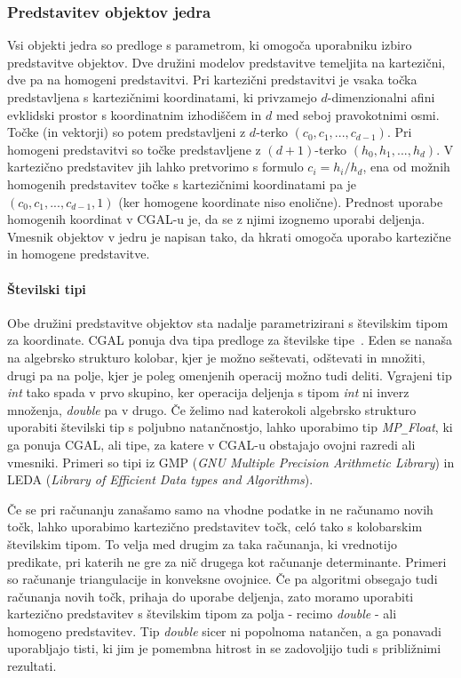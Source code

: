 \documentclass[a4paper, 12pt]{book}
\newcommand{\U}{\texttt{\_}}
\begin{document}
\subsubsection{Predstavitev objektov jedra}
Vsi objekti jedra so predloge s parametrom, ki omogoča uporabniku izbiro predstavitve objektov. Dve družini modelov predstavitve temeljita na kartezični, dve pa na homogeni predstavitvi. Pri kartezični predstavitvi je vsaka točka predstavljena s kartezičnimi koordinatami, ki privzamejo $d$-dimenzionalni afini evklidski prostor s koordinatnim izhodiščem in $d$ med seboj pravokotnimi osmi. Točke (in vektorji) so potem predstavljeni z $d$-terko $(c_0, c_1,..., c_{d-1})$. Pri homogeni predstavitvi so točke predstavljene z $(d+1)$-terko $(h_0, h_1,...,h_d)$. V kartezično predstavitev jih lahko pretvorimo s formulo $c_i = h_i/h_d$, ena od možnih homogenih predstavitev točke s kartezičnimi koordinatami pa je $(c_0, c_1,..., c_{d-1}, 1)$ (ker homogene koordinate niso enolične). Prednost uporabe homogenih koordinat v CGAL-u je, da se z njimi izognemo uporabi deljenja. Vmesnik objektov v jedru je napisan tako, da hkrati omogoča uporabo kartezične in homogene predstavitve. 

\paragraph*{Številski tipi}
Obe družini predstavitve objektov sta nadalje parametrizirani s številskim tipom za koordinate. CGAL ponuja dva tipa predloge za številske tipe~\cite{cgal:hhkps-nt-16b}. Eden se nanaša na algebrsko strukturo kolobar, kjer je možno seštevati, odštevati in množiti, drugi pa na polje, kjer je poleg omenjenih operacij možno tudi deliti. Vgrajeni tip \textit{int} tako spada v prvo skupino, ker operacija deljenja s tipom \textit{int} ni inverz množenja, \textit{double} pa v drugo. Če želimo nad katerokoli algebrsko strukturo uporabiti številski tip s poljubno natančnostjo, lahko uporabimo tip \textit{MP\U Float}, ki ga ponuja CGAL, ali tipe, za  katere v CGAL-u obstajajo ovojni razredi ali vmesniki. Primeri so tipi iz GMP (\textit{GNU Multiple Precision Arithmetic Library}) in LEDA (\textit{Library of Efficient Data types and Algorithms}).

\bigbreak
Če se pri računanju zanašamo samo na vhodne podatke in ne računamo novih točk, lahko uporabimo kartezično predstavitev točk, celó tako s kolobarskim številskim tipom. To velja med drugim za taka računanja, ki vrednotijo predikate, pri katerih ne gre za nič drugega kot računanje determinante. Primeri so računanje triangulacije in konveksne ovojnice. Če pa algoritmi obsegajo tudi računanja novih točk, prihaja do uporabe deljenja, zato moramo uporabiti kartezično predstavitev s številskim tipom za polja - recimo \textit{double} - ali homogeno predstavitev. Tip \textit{double} sicer ni popolnoma natančen, a ga ponavadi uporabljajo tisti, ki jim je pomembna hitrost in se zadovoljijo tudi s približnimi rezultati.
\end{document}
